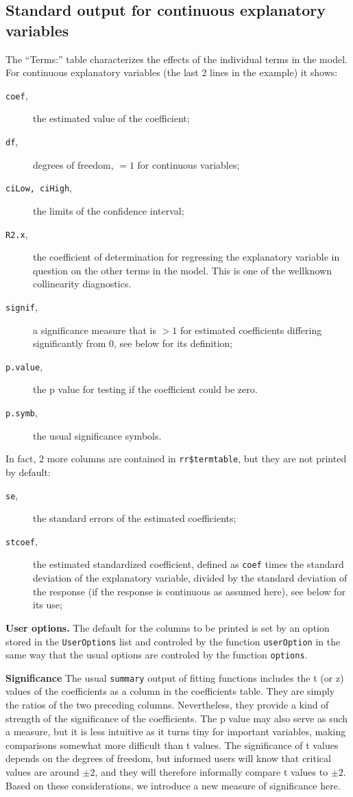 \documentclass[11pt]{article}
\providecommand{\T}{\texttt}
\providecommand{\Tit}[1]{\textbf{#1}\hspace{1em}}
\begin{document}
\subsection{Standard output for continuous explanatory variables}
The ``Terms:'' table characterizes the effects of the individual terms in
the model. For continuous explanatory variables (the last 2 lines in the
example) it shows:
\begin{description}
\item[\T{coef},] the estimated value of the coefficient;
\item[\T{df},] degrees of freedom, $=1$ for continuous variables;
\item[\T{ciLow, ciHigh},] the limits of the confidence interval;
\item[\T{R2.x},] the coefficient of determination for regressing 
  the explanatory variable in question on the other terms in the model.
  This is one of the wellknown collinearity diagnostics.
\item[\T{signif},] a significance measure that is $>1$ for estimated
  coefficients differing significantly from 0, see below for its
  definition;
\item[\T{p.value},] the p value for testing if the coefficient could be
  zero. 
\item[\T{p.symb},] the usual significance symbols.
\end{description}
In fact, 2 more columns are contained in \T{rr\$termtable}, but they are
not printed by default:
\begin{description}
\item[\T{se},] the standard errors of the estimated coefficients; 
\item[\T{stcoef},] the estimated standardized coefficient,
  defined as \T{coef} times the standard deviation of the explanatory
  variable, divided by the standard deviation of the response (if
  the response is continuous as assumed here), see below for its use;
\end{description}
\Tit{User options.}
The default for the columns to be printed is set by an option stored 
in the \T{UserOptions} list and controled by the function 
\T{userOption} in the same way that the usual options are
controled by the function \T{options}.

\Tit{Significance}
The usual \T{summary} output of fitting functions includes the 
t (or z) values of the coefficients as a column in the coefficients 
table. 
They are simply the ratios of the two preceding columns. 
Nevertheless, they provide a kind of strength of the significance of the
coefficients. The p value may also serve as such a measure, but it is less 
intuitive as it turns tiny for important variables, making comparisons
somewhat more difficult than t values. 
The significance of t values depends on the degrees of freedom, but
informed users will know that critical values are around $\pm2$, and they will
therefore informally compare t values to $\pm2$. 
Based on these considerations, we introduce a new measure of significance
here. 
\end{document}
